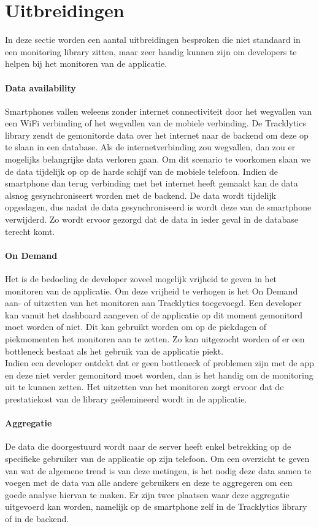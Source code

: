 \section{Uitbreidingen}
In deze sectie worden een aantal uitbreidingen besproken die niet standaard in een monitoring library zitten, maar zeer handig kunnen zijn om developers te helpen bij het monitoren van de applicatie.

\paragraph{Data availability}
Smartphones vallen weleens zonder internet connectiviteit door het wegvallen van een WiFi verbinding of het wegvallen van de mobiele verbinding. De Tracklytics library zendt de gemonitorde data over het internet naar de backend om deze op te slaan in een database. Als de internetverbinding zou wegvallen, dan zou er mogelijks belangrijke data verloren gaan. Om dit scenario te voorkomen slaan we de data tijdelijk op op de harde schijf van de mobiele telefoon. Indien de smartphone dan terug verbinding met het internet heeft gemaakt kan de data alsnog gesynchroniseert worden met de backend. De data wordt tijdelijk opgeslagen, dus nadat de data gesynchroniseerd is wordt deze van de smartphone verwijderd. Zo wordt ervoor gezorgd dat de data in ieder geval in de database terecht komt. 

\paragraph{On Demand}\label{par:OnDemand}
Het is de bedoeling de developer zoveel mogelijk vrijheid te geven in het monitoren van de applicatie. Om deze vrijheid te verhogen is het On Demand aan- of uitzetten van het monitoren aan Tracklytics toegevoegd. Een developer kan vanuit het dashboard aangeven of de applicatie op dit moment gemonitord moet worden of niet. Dit kan gebruikt worden om op de piekdagen of piekmomenten het monitoren aan te zetten. Zo kan uitgezocht worden of er een bottleneck bestaat als het gebruik van de applicatie piekt. \\
Indien een developer ontdekt dat er geen bottleneck of problemen zijn met de app en deze niet verder gemonitord moet worden, dan is het handig om de monitoring uit te kunnen zetten. Het uitzetten van het monitoren zorgt ervoor dat de prestatiekost van de library ge\"elemineerd wordt in de applicatie.


\paragraph{Aggregatie}\label{Arch:Aggregatie}
De data die doorgestuurd wordt naar de server heeft enkel betrekking op de specifieke gebruiker van de applicatie op zijn telefoon. Om een overzicht te geven van wat de algemene trend is van deze metingen, is het nodig deze data samen te voegen met de data van alle andere gebruikers en deze te aggregeren om een goede analyse hiervan te maken. Er zijn twee plaatsen waar deze aggregatie uitgevoerd kan worden, namelijk op de smartphone zelf in de Tracklytics library of in de backend. \\

